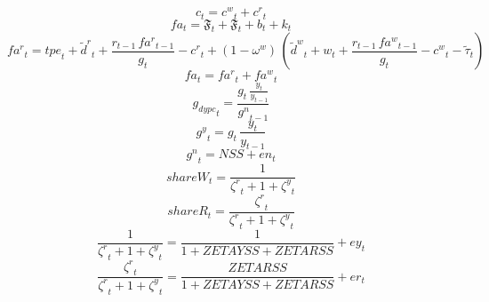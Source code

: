\begin{dmath}
{{c}}_{t}={{c^w}}_{t}+{{c^r}}_{t}
\end{dmath}
\begin{dmath}
{{fa}}_{t}={{\mathfrak{F}}}_{t}+{{\mathfrak{F}}}_{t}+{{b}}_{t}+{{k}}_{t}
\end{dmath}
\begin{dmath}
{{fa^r}}_{t}={{tpe}}_{t}+{\tilde{d}^r}_{t}+\frac{{{r}}_{t-1}\, {{fa^r}}_{t-1}}{{{g}}_{t}}-{{c^r}}_{t}+\left(1-{{\omega^w}}\right)\, \left({\tilde{d}^w}_{t}+{{w}}_{t}+\frac{{{r}}_{t-1}\, {{fa^w}}_{t-1}}{{{g}}_{t}}-{{c^w}}_{t}-{\tilde{\tau}}_{t}\right)
\end{dmath}
\begin{dmath}
{{fa}}_{t}={{fa^r}}_{t}+{{fa^w}}_{t}
\end{dmath}
\begin{dmath}
{{g_{dypc}}}_{t}=\frac{{{g}}_{t}\, \frac{{{y}}_{t}}{{{y}}_{t-1}}}{{{g^n}}_{t-1}}
\end{dmath}
\begin{dmath}
{{g^y}}_{t}={{g}}_{t}\, \frac{{{y}}_{t}}{{{y}}_{t-1}}
\end{dmath}
\begin{dmath}
{{g^n}}_{t}={{NSS}}+{{en}}_{t}
\end{dmath}
\begin{dmath}
{{shareW}}_{t}=\frac{1}{{{\zeta^{r}}}_{t}+1+{{\zeta^{y}}}_{t}}
\end{dmath}
\begin{dmath}
{{shareR}}_{t}=\frac{{{\zeta^{r}}}_{t}}{{{\zeta^{r}}}_{t}+1+{{\zeta^{y}}}_{t}}
\end{dmath}
\begin{dmath}
\frac{1}{{{\zeta^{r}}}_{t}+1+{{\zeta^{y}}}_{t}}=\frac{1}{1+{{ZETAYSS}}+{{ZETARSS}}}+{{ey}}_{t}
\end{dmath}
\begin{dmath}
\frac{{{\zeta^{r}}}_{t}}{{{\zeta^{r}}}_{t}+1+{{\zeta^{y}}}_{t}}=\frac{{{ZETARSS}}}{1+{{ZETAYSS}}+{{ZETARSS}}}+{{er}}_{t}
\end{dmath}

